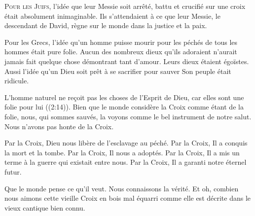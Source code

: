 \dvrule






\lettrine{P}{our les Juifs}, l'idée que leur Messie soit arrêté,
 battu et crucifié sur une croix était absolument inimaginable.
 Ils s'attendaient à ce que leur Messie, le descendant de David,
 règne sur le monde dans la justice et la paix.

Pour les Grecs, l'idée qu'un homme puisse mourir pour les péchés
 de tous les hommes était pure folie. Aucun des nombreux dieux
 qu'ils adoraient n'aurait jamais fait quelque chose démontrant tant d'amour.
 Leurs dieux étaient égoïstes. Aussi l'idée qu'un Dieu soit prêt
 à se sacrifier pour sauver Son peuple était ridicule.

\og L'homme naturel ne reçoit pas les choses de l'Esprit de Dieu,
 car elles sont une folie pour lui \fg{} ((2:14)).
 Bien que le monde considère la Croix comme étant de la folie, nous,
 qui sommes sauvés, la voyons comme le bel instrument de notre salut.
 Nous n'avons pas honte de la Croix.


Par la Croix, Dieu nous libère de l'esclavage au péché.
 Par la Croix, Il a conquis la mort et la tombe.
 Par la Croix, Il nous a adoptés.
 Par la Croix, Il a mis un terme à la guerre qui existait entre nous.
 Par la Croix, Il a garanti notre éternel futur.

Que le monde pense ce qu'il veut. Nous connaissons la vérité.
 Et oh, combien nous aimons cette \og vieille Croix en bois mal équarri \fg{}
 comme elle est décrite dans le vieux cantique bien connu.

\dvrule



